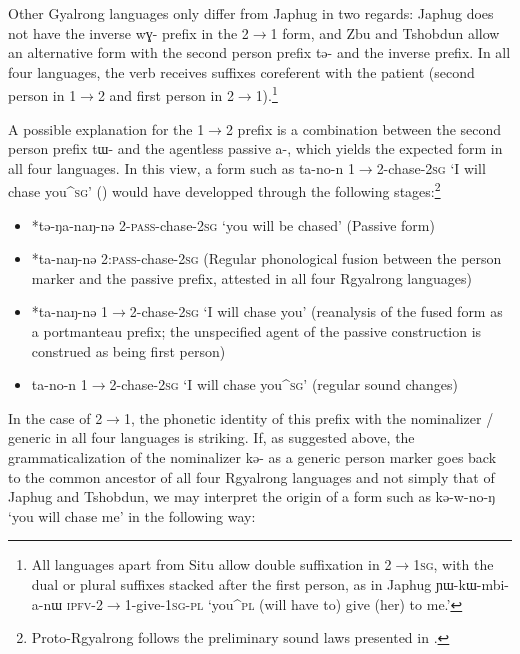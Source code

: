 \documentclass[oldfontcommands,oneside,a4paper,11pt]{article}
\newcommand{\ipa}[1]{\mbox{\phon #1}} %
\begin{document}
Other Gyalrong languages only differ from Japhug in two regards: Japhug does not have the inverse \ipa{wɣ-} prefix in the  2$\rightarrow$1 form, and Zbu and Tshobdun allow an alternative form with the second person prefix \ipa{tə-} and the inverse prefix. In all four languages, the verb receives suffixes coreferent with the patient (second person in 1$\rightarrow$2 and first person in  2$\rightarrow$1).\footnote{All languages apart from Situ allow double suffixation in 2$\rightarrow$\textsc{1sg}, with the dual or plural suffixes stacked after the first person, as in Japhug \ipa{ɲɯ-kɯ-mbi-a-nɯ} \textsc{ipfv}-2$\rightarrow$1-give-\textsc{1sg-pl} `you^{\textsc{pl}} (will have to) give (her) to me.'}


  A possible explanation for the 1$\rightarrow$2  prefix is a combination between the second person prefix \ipa{tɯ-} and the agentless passive \ipa{a-}, which yields the expected form in all four languages. In this view, a form such as \ipa{ta-no-n} 1$\rightarrow$2-chase-\textsc{2sg} `I will chase you^{\textsc{sg}}' (\citealt[219]{linxr93jiarong}) would have developped through the following stages:\footnote{Proto-Rgyalrong follows the preliminary sound laws presented in \citet{jacques04these}.}

\begin{itemize}
\item *\ipa{tə-ŋa-naŋ-nə}  2-\textsc{pass}-chase-\textsc{2sg} `you will be chased' (Passive form)
\item *\ipa{ta-naŋ-nə}  2:\textsc{pass}-chase-\textsc{2sg} (Regular phonological fusion between the person marker and the passive prefix, attested in all four Rgyalrong languages)  
\item  *\ipa{ta-naŋ-nə}  1$\rightarrow$2-chase-\textsc{2sg} `I will chase you' (reanalysis of the fused form as a portmanteau prefix; the unspecified agent of the passive construction is construed as being first person)
\item  \ipa{ta-no-n} 1$\rightarrow$2-chase-\textsc{2sg} `I will chase you^{\textsc{sg}}' (regular sound changes)
\end{itemize}


In the case of 2$\rightarrow$1, the phonetic identity of this prefix with the nominalizer / generic in all four languages is striking. If, as suggested above, the grammaticalization of the nominalizer \ipa{kə-} as a generic person marker goes back to the common ancestor of all four Rgyalrong languages and not simply that of Japhug and Tshobdun, we may interpret the origin of a form such as \ipa{kə-w-no-ŋ} `you will chase me' in the following way:
\end{document}
